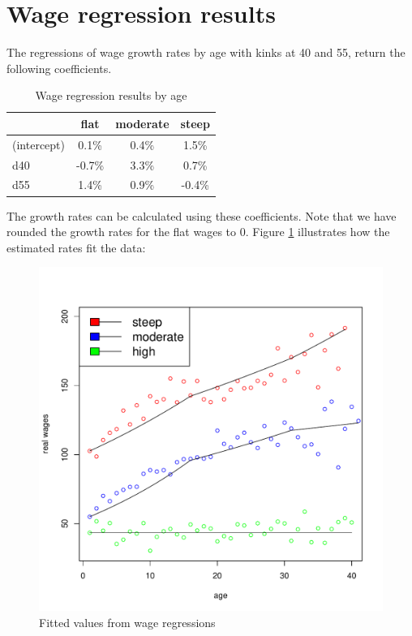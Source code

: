 \section{Wage regression results}
\label{paramcalibt}

The regressions of wage growth rates by age with kinks at 40 and 55, return the following coefficients.

\begin{table}[H]
	\centering
	\caption[]{Wage regression results by age}
	\begin{tabular}[c]{lccc}
		\hline
		&flat&moderate&steep\\
		\hline
		(intercept)&0.1\%&0.4\%&1.5\%\\
		d40&-0.7\%&3.3\%&0.7\%\\
		d55&1.4\%&0.9\%&-0.4\%\\
		\hline
	\end{tabular}
\end{table}

The growth rates can be calculated using these coefficients. Note that we have rounded the growth rates for the flat wages to $0$. Figure \ref{fig:heterwage} illustrates how the estimated rates fit the data:

\begin{figure}[h!]
	\centering
	\includegraphics[scale=0.3]{figs/heterwage.pdf}
	\caption{Fitted values from wage regressions}
	\label{fig:heterwage}
\end{figure}


